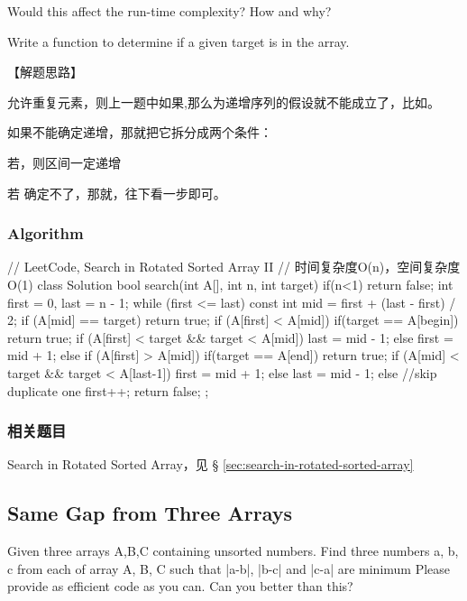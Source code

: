 Would this affect the run-time complexity? How and why?

Write a function to determine if a given target is in the array.


【解题思路】

允许重复元素，则上一题中如果,那么\fn{[l,m]}为递增序列的假设就不能成立了，比如\code{[1,3,1,1,1]}。

如果不能确定递增，那就把它拆分成两个条件：
\begindot
\item 若，则区间\fn{[l,m]}一定递增
\item 若 确定不了，那就，往下看一步即可。
\myenddot

\subsubsection{Algorithm}
\begin{Code}
	// LeetCode, Search in Rotated Sorted Array II
	// 时间复杂度O(n)，空间复杂度O(1)
	class Solution {
		bool search(int A[], int n, int target) {
            if(n<1) return false;
			int first = 0, last = n - 1;
			while (first <= last) {
				const int mid = first  + (last - first) / 2;
				if (A[mid] == target)	return true;
				if (A[first] < A[mid]) {
                    if(target == A[begin]) return true;
					if (A[first] < target && target < A[mid])
						last = mid - 1;
					else	
                        first = mid + 1;
				} else if (A[first] > A[mid]) {
                    if(target == A[end]) return true;
					if (A[mid] < target && target < A[last-1])
						first = mid + 1;
					else	
                        last = mid - 1;
				} else //skip duplicate one
					first++;
			}
			return false;
		}
	};
\end{Code}


\subsubsection{相关题目}

\begindot
\item Search in Rotated Sorted Array，见 \S
\ref{sec:search-in-rotated-sorted-array}
\myenddot

\subsection{Same Gap from Three Arrays}
Given three arrays A,B,C containing unsorted numbers. Find three numbers a, b, c from each of array A, B, C such that |a-b|, |b-c| and |c-a| are minimum
Please provide as efficient code as you can.
Can you better than this?

